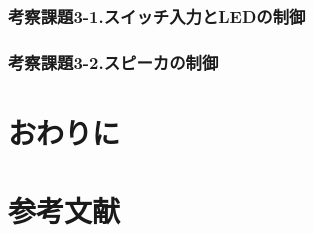 \documentclass[11pt,a4j]{jsarticle}
\begin{document}
   \subsubsection{考察課題3-1.スイッチ入力とLEDの制御}
   
   
   \subsubsection{考察課題3-2.スピーカの制御}
   
   
  
  
 \section{おわりに}
  
  
  
 \section{参考文献}
  
  
  
\end{document}
